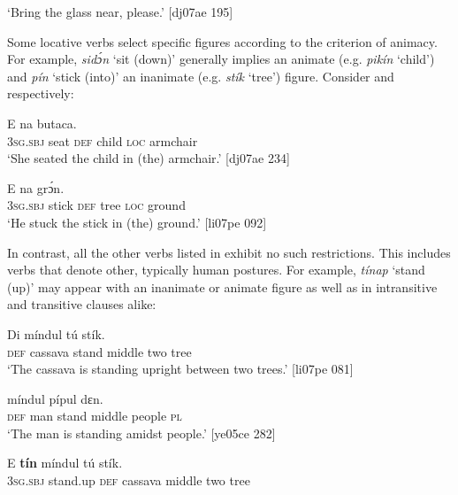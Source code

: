 \glt ‘Bring the glass near, please.’ [dj07ae 195]
\z

Some locative verbs select specific figures according to the criterion of animacy. For example, \textit{sidɔ́n} ‘sit (down)’ generally implies an animate (e.g.\textit{ pikín} ‘child’) and \textit{pín} ‘stick (into)’ an inanimate (e.g. \textit{stík} ‘tree’) figure. Consider  and  respectively: 


\ea%
    \label{ex:key:941}
    \gll E      na  butaca.\\
\textsc{3sg.sbj}  seat    \textsc{def}  child  \textsc{loc}  armchair\\

\glt ‘She seated the child in (the) armchair.’ [dj07ae 234]
\z


\ea%
    \label{ex:key:942}
    \gll E      na  grɔ́n.\\
\textsc{3sg.sbj}  stick  \textsc{def}  tree  \textsc{loc}  ground\\

\glt ‘He stuck the stick in (the) ground.’ [li07pe 092]
\z

In contrast, all the other verbs listed in  exhibit no such restrictions. This includes verbs that denote other, typically human postures. For example, \textit{tínap} ‘stand (up)’ may appear with an inanimate  or animate  figure as well as in intransitive and transitive  clauses alike:


\ea%
    \label{ex:key:943}
    \gll Di      míndul  tú  stík.\\
\textsc{def}  cassava  stand  middle  two  tree\\

\glt ‘The cassava is standing upright between two trees.’ [li07pe 081]
\z


\ea%
    \label{ex:key:944}
    \gll {}      míndul  pípul  dɛn.\\
\textsc{def}  man    stand  middle  people  \textsc{pl}\\

\glt ‘The man is standing amidst people.’ [ye05ce 282]
\z


\ea%
    \label{ex:key:945}
    \gll E    \textbf{tín}      míndul  tú  stík.\\
\textsc{3sg.sbj}  stand.up  \textsc{def}  cassava  middle  two  tree\\

